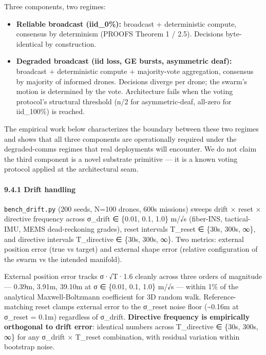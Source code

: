 Three components, two regimes:

\begin{itemize}
\tightlist
\item
  \textbf{Reliable broadcast (iid\_0\%):} broadcast + deterministic
  compute, consensus by determinism (PROOFS Theorem 1 / 2.5). Decisions
  byte-identical by construction.
\item
  \textbf{Degraded broadcast (iid loss, GE bursts, asymmetric deaf):}
  broadcast + deterministic compute + majority-vote aggregation,
  consensus by majority of informed drones. Decisions diverge per drone;
  the swarm's motion is determined by the vote. Architecture fails when
  the voting protocol's structural threshold (n/2 for asymmetric-deaf,
  all-zero for iid\_100\%) is reached.
\end{itemize}

The empirical work below characterizes the boundary between these two
regimes and shows that all three components are operationally required
under the degraded-comms regimes that real deployments will encounter.
We do not claim the third component is a novel substrate primitive ---
it is a known voting protocol applied at the architectural seam.

\paragraph{9.4.1 Drift handling}\label{drift-handling}

\texttt{bench\_drift.py} (200 seeds, N=100 drones, 600s missions) sweeps
drift × reset × directive frequency across σ\_drift ∈ \{0.01, 0.1, 1.0\}
m/√s (fiber-INS, tactical-IMU, MEMS dead-reckoning grades), reset
intervals T\_reset ∈ \{30s, 300s, ∞\}, and directive intervals
T\_directive ∈ \{30s, 300s, ∞\}. Two metrics: external position error
(true vs target) and external shape error (relative configuration of the
swarm vs the intended manifold).

External position error tracks σ·√T·1.6 cleanly across three orders of
magnitude --- 0.39m, 3.91m, 39.10m at σ ∈ \{0.01, 0.1, 1.0\} m/√s ---
within 1\% of the analytical Maxwell-Boltzmann coefficient for 3D random
walk. Reference-matching reset clamps external error to the σ\_reset
noise floor (\textasciitilde0.16m at σ\_reset = 0.1m) regardless of
σ\_drift. \textbf{Directive frequency is empirically orthogonal to drift
error}: identical numbers across T\_directive ∈ \{30s, 300s, ∞\} for any
σ\_drift × T\_reset combination, with residual variation within
bootstrap noise.

